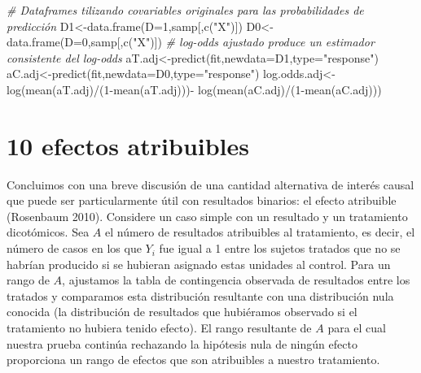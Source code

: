 \documentclass[
]{article}
\newenvironment{Shaded}{\begin{snugshade}}{\end{snugshade}}
\newcommand{\AttributeTok}[1]{\textcolor[rgb]{0.77,0.63,0.00}{#1}}
\newcommand{\CommentTok}[1]{\textcolor[rgb]{0.56,0.35,0.01}{\textit{#1}}}
\newcommand{\DecValTok}[1]{\textcolor[rgb]{0.00,0.00,0.81}{#1}}
\newcommand{\FunctionTok}[1]{\textcolor[rgb]{0.00,0.00,0.00}{#1}}
\newcommand{\NormalTok}[1]{#1}
\newcommand{\OtherTok}[1]{\textcolor[rgb]{0.56,0.35,0.01}{#1}}
\newcommand{\SpecialCharTok}[1]{\textcolor[rgb]{0.00,0.00,0.00}{#1}}
\newcommand{\StringTok}[1]{\textcolor[rgb]{0.31,0.60,0.02}{#1}}
\begin{document}
\begin{Shaded}
\begin{Highlighting}[]
\CommentTok{\# Dataframes tilizando covariables originales para las probabilidades de predicción}
\NormalTok{D1}\OtherTok{\textless{}{-}}\FunctionTok{data.frame}\NormalTok{(}\AttributeTok{D=}\DecValTok{1}\NormalTok{,samp[,}\FunctionTok{c}\NormalTok{(}\StringTok{"X"}\NormalTok{)]) }
\NormalTok{D0}\OtherTok{\textless{}{-}}\FunctionTok{data.frame}\NormalTok{(}\AttributeTok{D=}\DecValTok{0}\NormalTok{,samp[,}\FunctionTok{c}\NormalTok{(}\StringTok{"X"}\NormalTok{)]) }
\CommentTok{\# log{-}odds ajustado produce un estimador consistente del log{-}odds }
\NormalTok{aT.adj}\OtherTok{\textless{}{-}}\FunctionTok{predict}\NormalTok{(fit,}\AttributeTok{newdata=}\NormalTok{D1,}\AttributeTok{type=}\StringTok{"response"}\NormalTok{) }
\NormalTok{aC.adj}\OtherTok{\textless{}{-}}\FunctionTok{predict}\NormalTok{(fit,}\AttributeTok{newdata=}\NormalTok{D0,}\AttributeTok{type=}\StringTok{"response"}\NormalTok{) }
\NormalTok{log.odds.adj}\OtherTok{\textless{}{-}}\FunctionTok{log}\NormalTok{(}\FunctionTok{mean}\NormalTok{(aT.adj)}\SpecialCharTok{/}\NormalTok{(}\DecValTok{1}\SpecialCharTok{{-}}\FunctionTok{mean}\NormalTok{(aT.adj)))}\SpecialCharTok{{-}}
  \FunctionTok{log}\NormalTok{(}\FunctionTok{mean}\NormalTok{(aC.adj)}\SpecialCharTok{/}\NormalTok{(}\DecValTok{1}\SpecialCharTok{{-}}\FunctionTok{mean}\NormalTok{(aC.adj)))}
\end{Highlighting}
\end{Shaded}

\hypertarget{efectos-atribuibles}{%
\section{10 efectos atribuibles}\label{efectos-atribuibles}}

Concluimos con una breve discusión de una cantidad alternativa de
interés causal que puede ser particularmente útil con resultados
binarios: el efecto atribuible (Rosenbaum 2010). Considere un caso
simple con un resultado y un tratamiento dicotómicos. Sea \(A\) el
número de resultados atribuibles al tratamiento, es decir, el número de
casos en los que \(Y_i\) fue igual a 1 entre los sujetos tratados que no
se habrían producido si se hubieran asignado estas unidades al control.
Para un rango de \(A\), ajustamos la tabla de contingencia observada de
resultados entre los tratados y comparamos esta distribución resultante
con una distribución nula conocida (la distribución de resultados que
hubiéramos observado si el tratamiento no hubiera tenido efecto). El
rango resultante de \(A\) para el cual nuestra prueba continúa
rechazando la hipótesis nula de ningún efecto proporciona un rango de
efectos que son atribuibles a nuestro tratamiento.
\end{document}
